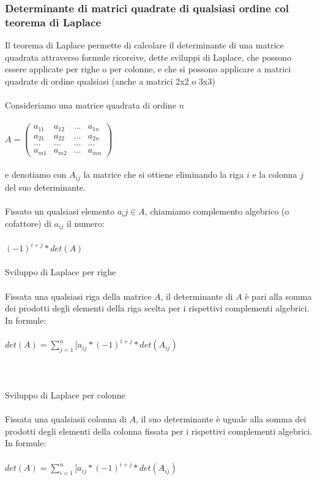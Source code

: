 \documentclass{report}
\begin{document}
\subsubsection{Determinante di matrici quadrate di qualsiasi ordine col teorema di Laplace}

Il teorema di Laplace permette di calcolare il determinante di una matrice quadrata attraverso formule ricorsive, dette sviluppi di Laplace, che possono essere applicate per righe o per colonne, e che si possono applicare a matrici quadrate di ordine qualsiasi (anche a matrici 2x2 o 3x3)
\\
\\
Consideriamo una matrice quadrata di ordine $n$
\\
\\
$A = \begin{pmatrix}
  a_{11} & a_{12} & ... & a_{1n} \\
  a_{21} & a_{22} & ... & a_{2n} \\
  ... & ... & ... & ... \\
  a_{m1} & a_{m2} & ... & a_{mn}
\end{pmatrix}
$
\\
\\
e denotiamo con $A_{ij}$ la matrice che si ottiene eliminando la riga $i$ e la colonna $j$ del suo determinante.
\\
\\
Fissato un qualsiasi elemento $a_ij \in A$, chiamiamo complemento algebrico (o cofattore) di $a_{ij}$ il numero:
\\
\\
$(-1)^{i+j} * det(A)$
\\
\\
Sviluppo di Laplace per righe 
\\
\\
Fissata una qualsiasi riga della matrice $A$, il determinante di $A$ è pari alla somma dei prodotti degli elementi della riga scelta per i rispettivi complementi algebrici. In formule:
\\
\\
$det(A) = \sum_{j=1}^{n} [a_{ij}*(-1)^{i+j}*det(A_{ij})$
\\
\\
\\
\\
Sviluppo di Laplace per colonne
\\
\\
Fissata una qualsiasii colonna di $A$, il suo determinante è uguale alla somma dei prodotti degli elementi della colonna fissata per i rispettivi complementi algebrici. In formule:
\\
\\
$det(A) = \sum_{i=1}^{n} [a_{ij}*(-1)^{i+j}*det(A_{ij})$
\\
\\
\end{document}
